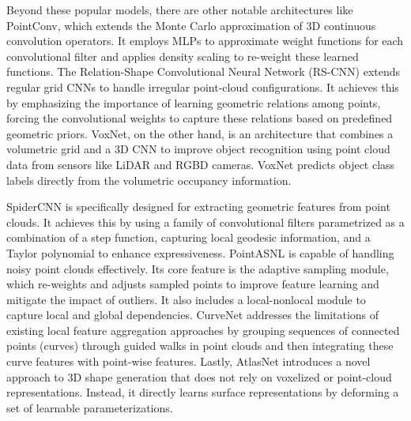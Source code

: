 \documentclass{ieeeaccess}
\begin{document}
Beyond these popular models, there are other notable architectures like PointConv, which extends the Monte Carlo approximation of 3D continuous convolution operators. It employs MLPs to approximate weight functions for each convolutional filter and applies density scaling to re-weight these learned functions.
The Relation-Shape Convolutional Neural Network (RS-CNN) extends regular grid CNNs to handle irregular point-cloud configurations. It achieves this by emphasizing the importance of learning geometric relations among points, forcing the convolutional weights to capture these relations based on predefined geometric priors.
VoxNet, on the other hand, is an architecture that combines a volumetric grid and a 3D CNN to improve object recognition using point cloud data from sensors like LiDAR and RGBD cameras. VoxNet predicts object class labels directly from the volumetric occupancy information. 

SpiderCNN is specifically designed for extracting geometric features from point clouds. It achieves this by using a family of convolutional filters parametrized as a combination of a step function, capturing local geodesic information, and a Taylor polynomial to enhance expressiveness.
PointASNL is capable of handling noisy point clouds effectively. Its core feature is the adaptive sampling module, which re-weights and adjusts sampled points to improve feature learning and mitigate the impact of outliers. It also includes a local-nonlocal module to capture local and global dependencies.
CurveNet addresses the limitations of existing local feature aggregation approaches by grouping sequences of connected points (curves) through guided walks in point clouds and then integrating these curve features with point-wise features.
Lastly, AtlasNet introduces a novel approach to 3D shape generation that does not rely on voxelized or point-cloud representations. Instead, it directly learns surface representations by deforming a set of learnable parameterizations.
\end{document}
